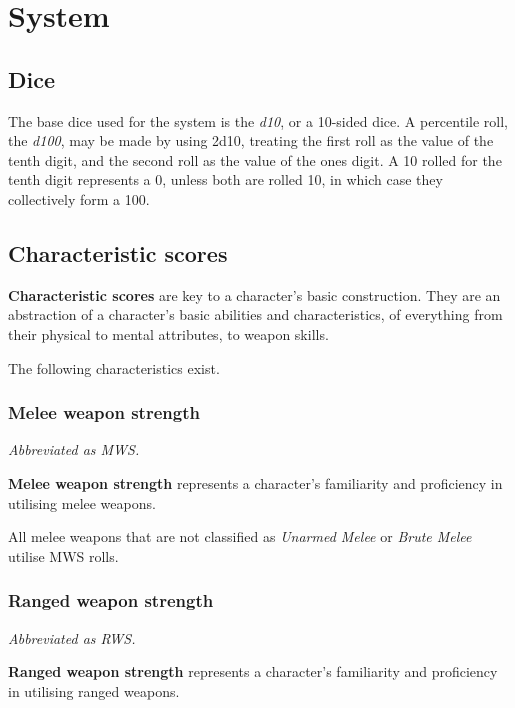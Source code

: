 \documentclass[12pt,]{article}
\date{}
\begin{document}
{
\setcounter{tocdepth}{3}
\tableofcontents
}
\section{System}\label{system}

\subsection{Dice}\label{dice}

The base dice used for the system is the \emph{d10}, or a 10-sided dice.
A percentile roll, the \emph{d100}, may be made by using 2d10, treating
the first roll as the value of the tenth digit, and the second roll as
the value of the ones digit. A 10 rolled for the tenth digit represents
a 0, unless both are rolled 10, in which case they collectively form a
100.

\subsection{Characteristic scores}\label{characteristic-scores}

\textbf{Characteristic scores} are key to a character's basic
construction. They are an abstraction of a character's basic abilities
and characteristics, of everything from their physical to mental
attributes, to weapon skills.

The following characteristics exist.

\subsubsection{Melee weapon strength}\label{melee-weapon-strength}

\emph{Abbreviated as MWS.}

\textbf{Melee weapon strength} represents a character's familiarity and
proficiency in utilising melee weapons.

All melee weapons that are not classified as \emph{Unarmed Melee} or
\emph{Brute Melee} utilise MWS rolls.

\subsubsection{Ranged weapon strength}\label{ranged-weapon-strength}

\emph{Abbreviated as RWS.}

\textbf{Ranged weapon strength} represents a character's familiarity and
proficiency in utilising ranged weapons.
\end{document}
